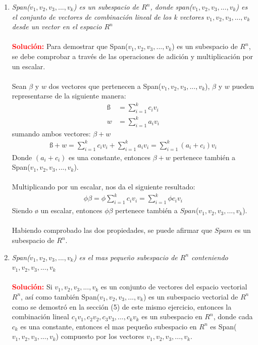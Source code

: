 \documentclass[12pt]{article}
\begin{document}
\begin{enumerate}
 \item \textit{Span($v_{1},v_{2},v_{3}, ..., v_{k}$) es un subespacio de $R^{n}$, donde span($v_{1},v_{2},v_{3}, ..., v_{k}$) es el conjunto de vectores de combinación lineal de los k vectores $v_{1},v_{2},v_{3}, ..., v_{k}$ desde un vector en el espacio $R^{n}$} \\ \\
 \noindent \textcolor{red}{\bf Solución:}
 Para demostrar que Span($v_{1},v_{2},v_{3}, ..., v_{k}$) es un subespacio de $R^{n}$, se debe comprobar a través de las operaciones de adición y multiplicación por un escalar. \\ \\
 Sean $\beta$ y $w$ dos vectores que pertenecen a Span($v_{1},v_{2},v_{3}, ..., v_{k}$), $\beta$ y $w$ pueden representarse de la siguiente manera:
  \begin {equation*} \begin {split}
ß &= \sum_{i=1}^{k}c_{i}v_{i} \\  
w &= \sum_{i=1}^{k}a_{i}v_{i} 
 \end {split} \end {equation*}
sumando ambos vectores: $\beta + w$
  \begin {equation*} \begin {split}
  ß + w = \sum_{i=1}^{k}c_{i}v_{i}  + \sum_{i=1}^{k}a_{i}v_{i} =  \sum_{i=1}^{k}(a_{i}+c_{i})v_{i} 
  \end {split} \end {equation*}
  Donde $(a_{i}+c_{i})$ es una constante, entonces $\beta+w$ pertenece también a  Span($v_{1},v_{2},v_{3}, ..., v_{k}$). \\ \\
 Multiplicando por un escalar, nos da el siguiente resultado:
    \begin {equation*} \begin {split}
  \phi \beta = \phi \sum_{i=1}^{k}c_{i}v_{i} = \sum_{i=1}^{k} \phi c_{i}v_{i}
    \end {split} \end {equation*}
  Siendo ø un escalar, entonces $\phi \beta$ pertenece también a $Span$($v_{1},v_{2},v_{3}, ..., v_{k}$). \\ \\ 
  Habiendo comprobado las dos propiedades, se puede afirmar que $Spam$  es un subespacio de $R^{n}$. \\ 
  \item \textit{Span($v_{1},v_{2},v_{3}, ..., v_{k}$) es el mas pequeño subespacio de $R^{n}$ conteniendo $v_{1},v_{2},v_{3}, ..., v_{k}$} \\\\
  \noindent \textcolor{red}{\bf Solución:}
  Si $v_{1},v_{2},v_{3}, ..., v_{k}$ es un conjunto de vectores del espacio vectorial $R^{n}$, así como también Span($v_{1},v_{2},v_{3}, ..., v_{k}$) es un subespacio vectorial de $R^{n}$ como se demostró en la sección (5) de este mismo ejercicio, entonces la combinación lineal $c_{1}v_{1},c_{2}v_{2},c_{3}v_{3}, ..., c_{k}v_{k}$ es un subespacio en $R^{n}$, donde cada $c_{k}$ es una constante, entonces el mas pequeño subespacio en $R^{n}$ es Span($v_{1},v_{2},v_{3}, ..., v_{k}$) compuesto por los vectores $v_{1},v_{2},v_{3}, ..., v_{k}$.
  

\end{enumerate}
\end{document}
